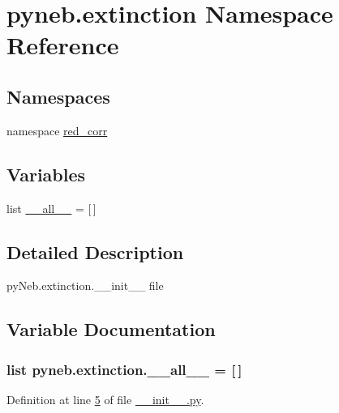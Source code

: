 \hypertarget{namespacepyneb_1_1extinction}{\section{pyneb.\-extinction Namespace Reference}
\label{namespacepyneb_1_1extinction}
}
\subsection*{Namespaces}
\begin{DoxyCompactItemize}
\item 
namespace \hyperlink{namespacepyneb_1_1extinction_1_1red__corr}{red\-\_\-corr}
\end{DoxyCompactItemize}
\subsection*{Variables}
\begin{DoxyCompactItemize}
\item 
list \hyperlink{namespacepyneb_1_1extinction_ac47e2b9084a5ecfc36e3f0fad7ba3b5d}{\-\_\-\-\_\-all\-\_\-\-\_\-} = \mbox{[}$\,$\mbox{]}
\end{DoxyCompactItemize}


\subsection{Detailed Description}
\begin{DoxyVerb}pyNeb.extinction.__init__ file
\end{DoxyVerb}
 

\subsection{Variable Documentation}
\hypertarget{namespacepyneb_1_1extinction_ac47e2b9084a5ecfc36e3f0fad7ba3b5d}{
\subsubsection[{\-\_\-\-\_\-all\-\_\-\-\_\-}]{\setlength{\rightskip}{0pt plus 5cm}list pyneb.\-extinction.\-\_\-\-\_\-all\-\_\-\-\_\- = \mbox{[}$\,$\mbox{]}}}\label{namespacepyneb_1_1extinction_ac47e2b9084a5ecfc36e3f0fad7ba3b5d}


Definition at line \hyperlink{extinction_2____init_____8py_source_l00005}{5} of file \hyperlink{extinction_2____init_____8py_source}{\-\_\-\-\_\-init\-\_\-\-\_\-.\-py}.

